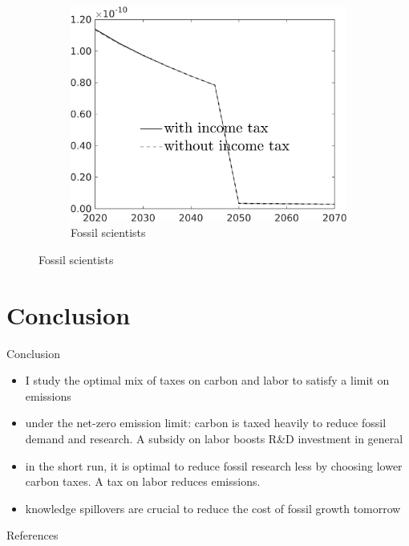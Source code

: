 \documentclass[11pt,aspectratio=169]{beamer}
\begin{document}
\begin{frame}
\begin{figure}
\begin{subfigure}{0.32\textwidth}
	\end{subfigure}
	\begin{subfigure}{0.32\textwidth}		
		\caption{Fossil scientists}
		\includegraphics[width=1\textwidth]{../codding_model/own_basedOnFried/optimalPol_010922_revision/figures/all_13Sept22_Tplus30/sff_OPT_COMPtaul_regime4_spillover0_knspil0_noskill0_sep0_xgrowth0_PV1_etaa0.79_lgd1.png}
	\end{subfigure}
\end{figure}
\end{frame}

\hypertarget{conc}{}
\section*{Conclusion}
\begin{frame}{Conclusion}
	\begin{itemize}[<+-| alert@+>]
	\item I study the optimal mix of taxes on carbon and labor to satisfy a limit on emissions
	\vspace{3mm}
	\item under the net-zero emission limit: carbon is taxed heavily to reduce fossil demand and research. A subsidy on labor boosts R\&D investment in general
	\vspace{3mm}
	\item in the short run, it is optimal to reduce fossil research less by choosing lower carbon taxes. A tax on labor reduces emissions. 
	\vspace{3mm}
	\item knowledge spillovers are crucial to reduce the cost of fossil growth tomorrow
\end{itemize}
\end{frame}
\begin{frame}[shrink]{References}
	
	
	
\end{frame}
\end{document}
